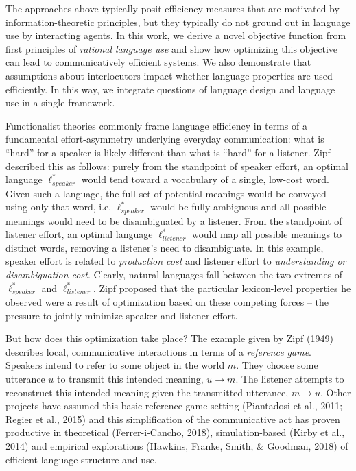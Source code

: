 \documentclass[10pt, letterpaper]{article}
\begin{document}
The approaches above typically posit efficiency measures that are
motivated by information-theoretic principles, but they typically do not
ground out in language use by interacting agents. In this work, we
derive a novel objective function from first principles of
\textit{rational language use} and show how optimizing this objective
can lead to communicatively efficient systems. We also demonstrate that
assumptions about interlocutors impact whether language properties are
used efficiently. In this way, we integrate questions of language design
and language use in a single framework.\par

Functionalist theories commonly frame language efficiency in terms of a
fundamental effort-asymmetry underlying everyday communication: what is
``hard'' for a speaker is likely different than what is ``hard'' for a
listener. Zipf described this as follows: purely from the standpoint of
speaker effort, an optimal language \(\ell_{speaker}^*\) would tend
toward a vocabulary of a single, low-cost word. Given such a language,
the full set of potential meanings would be conveyed using only that
word, i.e. \(\ell_{speaker}^*\) would be fully ambiguous and all
possible meanings would need to be disambiguated by a listener. From the
standpoint of listener effort, an optimal language \(\ell_{listener}^*\)
would map all possible meanings to distinct words, removing a listener's
need to disambiguate. In this example, speaker effort is related to
\emph{production cost} and listener effort to \emph{understanding or
disambiguation cost}. Clearly, natural languages fall between the two
extremes of \(\ell_{speaker}^*\) and \(\ell_{listener}^*\). Zipf
proposed that the particular lexicon-level properties he observed were a
result of optimization based on these competing forces -- the pressure
to jointly minimize speaker and listener effort.\par

But how does this optimization take place? The example given by Zipf
(1949) describes local, communicative interactions in terms of a
\textit{reference game}. Speakers intend to refer to some object in the
world \(m\). They choose some utterance \(u\) to transmit this intended
meaning, \(u \rightarrow m\). The listener attempts to reconstruct this
intended meaning given the transmitted utterance, \(m \rightarrow u\).
Other projects have assumed this basic reference game setting
(Piantadosi et al., 2011; Regier et al., 2015) and this simplification
of the communicative act has proven productive in theoretical
(Ferrer-i-Cancho, 2018), simulation-based (Kirby et al., 2014) and
empirical explorations (Hawkins, Franke, Smith, \& Goodman, 2018) of
efficient language structure and use.\par
\end{document}
